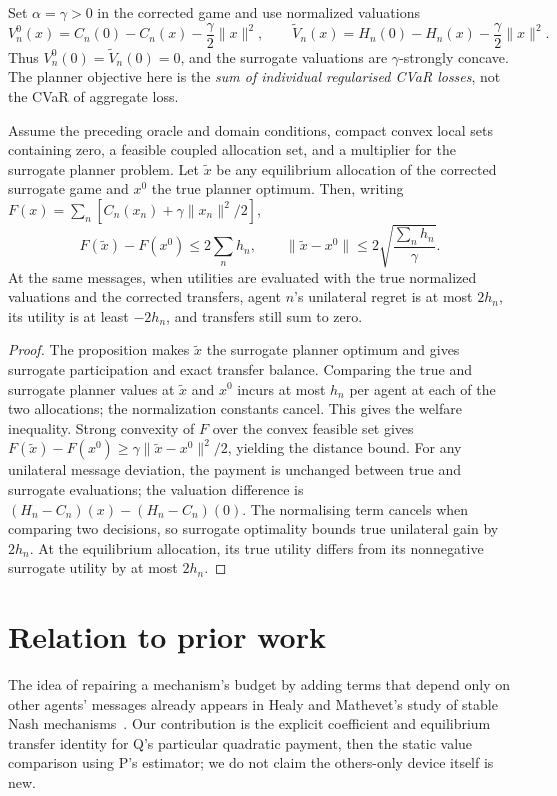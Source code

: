 \documentclass{article}
\begin{document}
Set \(\alpha=\gamma>0\) in the corrected game and use normalized valuations
\[
V_n^0(x)=C_n(0)-C_n(x)-\frac\gamma2\|x\|^2,
\qquad
\widetilde V_n(x)=H_n(0)-H_n(x)-\frac\gamma2\|x\|^2.
\]
Thus \(V_n^0(0)=\widetilde V_n(0)=0\), and the surrogate valuations are \(\gamma\)-strongly concave. The planner objective here is the \emph{sum of individual regularised CVaR losses}, not the CVaR of aggregate loss. %

\begin{theorem}
Assume the preceding oracle and domain conditions, compact convex local sets containing zero, a feasible coupled allocation set, and a multiplier for the surrogate planner problem. Let \(\widetilde x\) be any equilibrium allocation of the corrected surrogate game and \(x^0\) the true planner optimum. Then, writing \(F(x)=\sum_n[C_n(x_n)+\gamma\|x_n\|^2/2]\),
\[
F(\widetilde x)-F(x^0)\leq2\sum_nh_n,
\qquad
\|\widetilde x-x^0\|\leq
2\sqrt{\frac{\sum_nh_n}{\gamma}}.
\]
At the same messages, when utilities are evaluated with the true normalized valuations and the corrected transfers, agent \(n\)'s unilateral regret is at most \(2h_n\), its utility is at least \(-2h_n\), and transfers still sum to zero.
\end{theorem} %

\begin{proof}
The proposition makes \(\widetilde x\) the surrogate planner optimum and gives surrogate participation and exact transfer balance. Comparing the true and surrogate planner values at \(\widetilde x\) and \(x^0\) incurs at most \(h_n\) per agent at each of the two allocations; the normalization constants cancel. This gives the welfare inequality. Strong convexity of \(F\) over the convex feasible set gives \(F(\widetilde x)-F(x^0)\geq\gamma\|\widetilde x-x^0\|^2/2\), yielding the distance bound. For any unilateral message deviation, the payment is unchanged between true and surrogate evaluations; the valuation difference is \((H_n-C_n)(x)-(H_n-C_n)(0)\). The normalising term cancels when comparing two decisions, so surrogate optimality bounds true unilateral gain by \(2h_n\). At the equilibrium allocation, its true utility differs from its nonnegative surrogate utility by at most \(2h_n\). %
\end{proof}

\section{Relation to prior work}
The idea of repairing a mechanism's budget by adding terms that depend only on other agents' messages already appears in Healy and Mathevet's study of stable Nash mechanisms~\cite{healy2012stable}. Our contribution is the explicit coefficient and equilibrium transfer identity for Q's particular quadratic payment, then the static value comparison using P's estimator; we do not claim the others-only device itself is new. %
\end{document}
